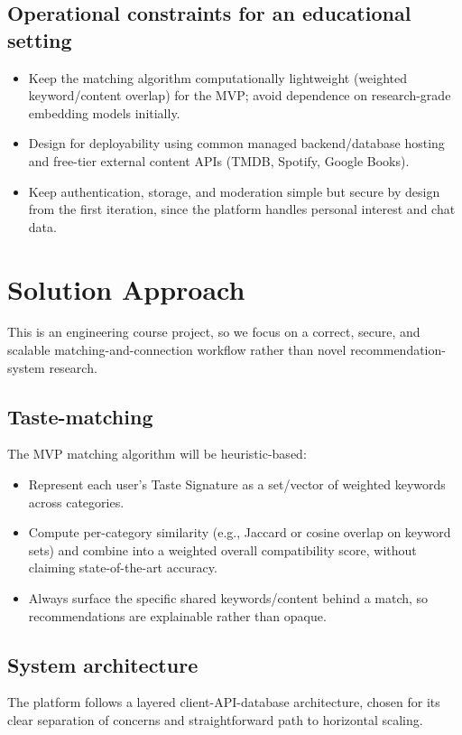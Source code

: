 \documentclass[11pt,a4paper]{article}
\begin{document}
\subsection{Operational constraints for an educational setting}
\begin{itemize}[leftmargin=0.7cm]
    \item Keep the matching algorithm computationally lightweight (weighted keyword/content overlap) for the MVP; avoid dependence on research-grade embedding models initially.
    \item Design for deployability using common managed backend/database hosting and free-tier external content APIs (TMDB, Spotify, Google Books).
    \item Keep authentication, storage, and moderation simple but secure by design from the first iteration, since the platform handles personal interest and chat data.
\end{itemize}

\section{Solution Approach}
This is an engineering course project, so we focus on a correct, secure, and scalable matching-and-connection workflow rather than novel recommendation-system research.

\subsection{Taste-matching}
The MVP matching algorithm will be heuristic-based:
\begin{itemize}[leftmargin=0.7cm]
    \item Represent each user's Taste Signature as a set/vector of weighted keywords across categories.
    \item Compute per-category similarity (e.g., Jaccard or cosine overlap on keyword sets) and combine into a weighted overall compatibility score, without claiming state-of-the-art accuracy.
    \item Always surface the specific shared keywords/content behind a match, so recommendations are explainable rather than opaque.
\end{itemize}

\subsection{System architecture}
The platform follows a layered client-API-database architecture, chosen for its clear separation
of concerns and straightforward path to horizontal scaling.
\end{document}
